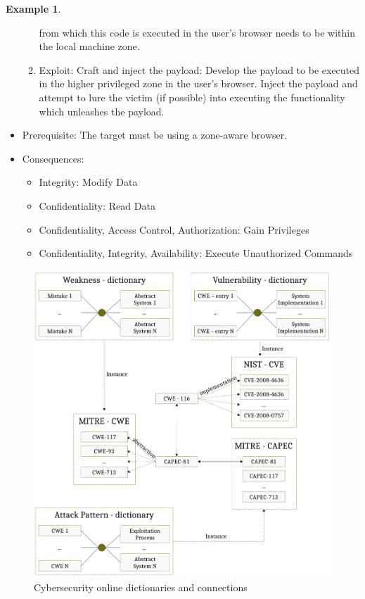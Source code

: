 \documentclass{article}
\theoremstyle{definition}
\theoremstyle{corollary}
\theoremstyle{lemma}
\theoremstyle{theorem}
\theoremstyle{theorem}
\newtheorem{example}{Example}
\begin{document}
\begin{example}
\begin{itemize}
\begin{enumerate}
					from which this code is executed in the
					user's browser needs to be within the
					local machine zone.
				\item Exploit: Craft and inject the payload:
					Develop the payload to be executed in
					the higher privileged zone in the
					user's browser. Inject the payload and
					attempt to lure the victim (if
					possible) into executing the
					functionality which unleashes the
					payload.
			\end{enumerate}
		\item Prerequisite: The target must be using a zone-aware browser. 
		\item Consequences: 
			\begin{itemize}
				\item Integrity: Modify Data
				\item Confidentiality: Read Data
				\item Confidentiality, Access Control, Authorization: Gain Privileges
				\item Confidentiality, Integrity, Availability: Execute Unauthorized Commands
			\end{itemize}
	\end{itemize}

\end{example}

\begin{figure}[t]
	\centering
	\includegraphics[width=\textwidth]{cwe-nvd-capec.pdf}
	\caption{Cybersecurity online dictionaries and connections}
	\label{fig:cwe-nvd-capec}
\end{figure}
\end{document}
